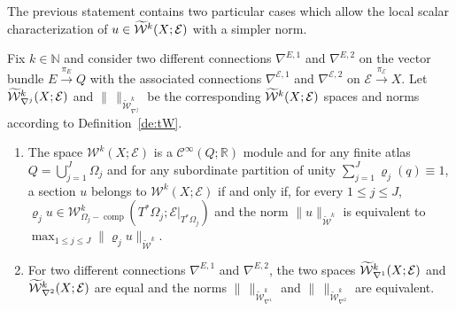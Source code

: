 \documentclass[AHL,Unicode,longabstracts]{cedram}
\newcommand{\R}{\mathbb{R}}
\newcommand{\N}{\mathbb{N}}
\newcommand{\clW}{\mathcal{W}}
\newcommand{\clC}{\mathcal{C}}
\newcommand{\clE}{\mathcal{E}}
\DeclareMathOperator{\ccomp}{comp}
\let\oldtilde\tilde
\renewcommand*{\tilde}[1]{\mathchoice{\widetilde{#1}}{\widetilde{#1}}{\oldtilde{#1}}{\oldtilde{#1}}}
\begin{document}
The previous statement contains two particular cases which allow the local scalar characterization of $u\in \tilde{\clW}^{k}(X;\clE)$ with a simpler norm.

\begin{prop}\label{pr:Wkred}
Fix $k\in \N$ and consider two different connections $\nabla^{E,1}$ and $\nabla^{E,2}$ on the vector bundle $E\xrightarrow{\pi_{E}} Q$ with the associated connections $\nabla^{\clE,1}$ and $\nabla^{\clE,2}$ on $\clE\xrightarrow{\pi_{\clE}} X$. Let $\tilde{\clW}_{\nabla^{j}}^{k}(X;\clE)$ and $\|\,\|_{\widetilde{\clW}^{k}_{\nabla^{j}}}$ be the corresponding $\tilde{\clW}^{k}(X;\clE)$ spaces and norms according to Definition~\ref{de:tW}.
\begin{enumerate}
\item\label{prop3.2.1} The space $\clW^{k}(X;\clE)$ is a $\clC^{\infty}(Q;\R)$ module and for any finite atlas\linebreak $Q=\bigcup_{j=1}^{J}\Omega_{j}$ and for any subordinate partition of unity $\sum_{j=1}^{J}\varrho_{j}(q)\equiv 1$, a section $u$ belongs to $\clW^{k}(X;\clE)$ if and only if, for every $1\leq j\leq J$,\linebreak $\varrho_{j}u\in \clW^{k}_{\Omega_{j}-\ccomp}(T^{*}\Omega_{j}; \clE|_{T^{*}\Omega_{j}})$ and the norm $\|u\|_{\widetilde{\clW}^{k}}$ is equivalent to\linebreak $\max_{1\leq j\leq J}\|\varrho_{j}u\|_{\widetilde{\clW}^{k}}$.
\item\label{prop3.2.2} For two different connections $\nabla^{E,1}$ and $\nabla^{E,2}$, the two spaces $\tilde{\clW}_{\nabla^{1}}^{k}(X;\clE)$ and $\tilde{\clW}^{k}_{\nabla^{2}}(X;\clE)$ are equal and the norms $\|\,\|_{\widetilde{\clW}^{k}_{\nabla^{1}}}$ and $\|\,\|_{\widetilde{\clW}^{k}_{\nabla^{2}}}$ are equivalent.
\end{enumerate}
\end{prop}
\end{document}
